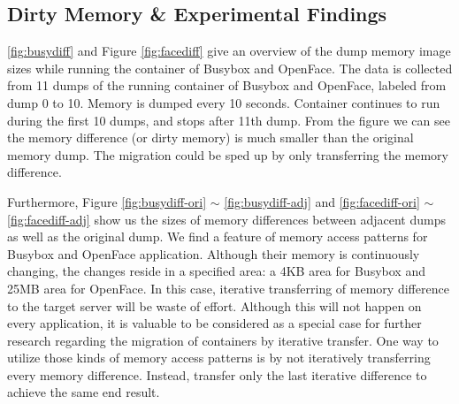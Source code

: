 



\subsection{Dirty Memory \& Experimental Findings}





\ref{fig:busydiff}  and 
Figure \ref{fig:facediff}
give an overview of the dump memory image sizes while running the container of Busybox and  OpenFace. 
The data is collected from 11 dumps of the running container of Busybox and OpenFace, labeled from dump 0 to 10. Memory is dumped every 10 seconds. Container continues to run during the first 10 dumps, and stops after 11th dump. From the figure we can see the memory difference (or dirty memory) is much smaller than the original memory dump. The migration could be sped up by only  transferring the memory difference. 

Furthermore, 
Figure  
\ref{fig:busydiff-ori} $\sim$
\ref{fig:busydiff-adj}  
and 
\ref{fig:facediff-ori} $\sim$
\ref{fig:facediff-adj} 
show us the sizes of memory differences between adjacent dumps as well as the original dump. We find a feature of memory access patterns for Busybox and OpenFace application. Although their memory is continuously changing, the changes reside in a specified area: a 4KB area for Busybox and 25MB area for OpenFace. 
In this case, iterative transferring of memory difference to the target server will be waste of effort. Although this will not happen on every application, it is valuable to be considered as a special case for further research regarding the migration of containers by iterative transfer. One way to utilize those kinds of memory access patterns is by not iteratively transferring every memory difference. Instead, transfer only the last iterative difference to achieve the same end result.

